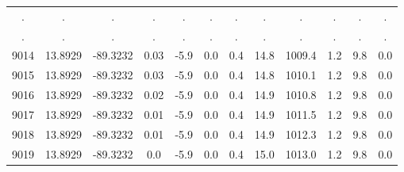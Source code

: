 \begin{table}
\begin{tabular}{cccccccccccc}
             . &                      . &                          . &                      . &                      . &                . &                . &               . &                . &                       . &                 . &              . \\
             . &                      . &                          . &                      . &                      . &                . &                . &               . &                . &                       . &                 . &              . \\
          9014 &                13.8929 &                   -89.3232 &                   0.03 &                   -5.9 &              0.0 &              0.4 &            14.8 &           1009.4 &                     1.2 &               9.8 &            0.0 \\
          9015 &                13.8929 &                   -89.3232 &                   0.03 &                   -5.9 &              0.0 &              0.4 &            14.8 &           1010.1 &                     1.2 &               9.8 &            0.0 \\
          9016 &                13.8929 &                   -89.3232 &                   0.02 &                   -5.9 &              0.0 &              0.4 &            14.9 &           1010.8 &                     1.2 &               9.8 &            0.0 \\
          9017 &                13.8929 &                   -89.3232 &                   0.01 &                   -5.9 &              0.0 &              0.4 &            14.9 &           1011.5 &                     1.2 &               9.8 &            0.0 \\
          9018 &                13.8929 &                   -89.3232 &                   0.01 &                   -5.9 &              0.0 &              0.4 &            14.9 &           1012.3 &                     1.2 &               9.8 &            0.0 \\
          9019 &                13.8929 &                   -89.3232 &                    0.0 &                   -5.9 &              0.0 &              0.4 &            15.0 &           1013.0 &                     1.2 &               9.8 &            0.0 \\
\bottomrule
\end{tabular}
\end{table}
